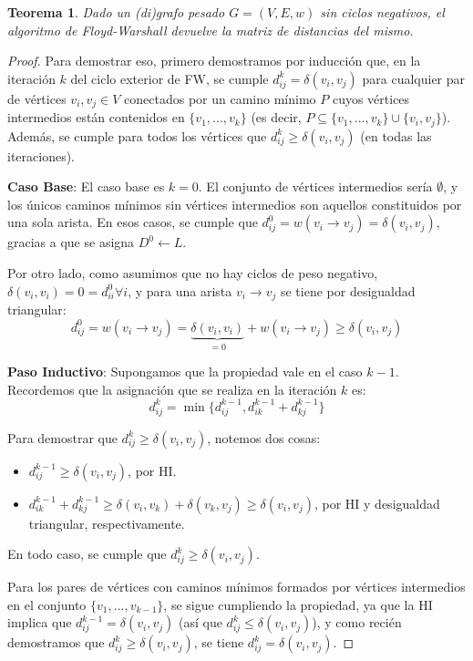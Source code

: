 \documentclass[a4paper]{report}
\newtheorem*{theorem*}{Teorema}
\begin{document}
\begin{theorem*}
    Dado un (di)grafo pesado $G = (V, E, w)$ sin ciclos negativos, el algoritmo de Floyd-Warshall devuelve la matriz de distancias del mismo.
\end{theorem*}
\begin{proof}
    Para demostrar eso, primero demostramos por inducción que, en la iteración $k$ del ciclo exterior de FW, se cumple $d^k_{ij} = \delta(v_i, v_j)$ para cualquier par de vértices $v_i, v_j \in V$ conectados por un camino mínimo $P$ cuyos vértices intermedios están contenidos en $\{v_1, ..., v_k\}$ (es decir, $P \subseteq \{v_1, ..., v_k\} \cup \{v_i, v_j\}$). Además, se cumple para todos los vértices que $d^k_{ij} \geq \delta(v_i, v_j)$ (en todas las iteraciones).

    \textbf{Caso Base}: El caso base es $k = 0$. El conjunto de vértices intermedios sería $\emptyset$, y los únicos caminos mínimos sin vértices intermedios son aquellos constituidos por una sola arista. En esos casos, se cumple que $d^0_{ij} = w(v_i \rightarrow v_j) = \delta(v_i, v_j)$, gracias a que se asigna $D^0 \gets L$.

    Por otro lado, como asumimos que no hay ciclos de peso negativo, $\delta(v_i, v_i) = 0 = d^0_{ii} \forall i$, y para una arista $v_i \rightarrow v_j$ se tiene por desigualdad triangular:
    $$d^0_{ij} = w(v_i \rightarrow v_j) = \underbrace{{\delta(v_i, v_i)}}_{= 0} + w(v_i \rightarrow v_j) \geq \delta(v_i, v_j)$$

    \textbf{Paso Inductivo}: Supongamos que la propiedad vale en el caso $k - 1$. Recordemos que la asignación que se realiza en la iteración $k$ es:
    $$d^k_{ij} = \min{\{d^{k - 1}_{ij}, d^{k - 1}_{ik} + d^{k - 1}_{kj}\}}$$

    Para demostrar que $d^k_{ij} \geq \delta(v_i, v_j)$, notemos dos cosas:
    \begin{itemize}
        \item $d^{k - 1}_{ij} \geq \delta(v_i, v_j)$, por HI.
        \item $d^{k - 1}_{ik} + d^{k - 1}_{kj} \geq \delta(v_i, v_k) + \delta(v_k, v_j) \geq \delta(v_i, v_j)$, por HI y desigualdad triangular, respectivamente.
    \end{itemize}

    En todo caso, se cumple que $d^k_{ij} \geq \delta(v_i, v_j)$.

    Para los pares de vértices con caminos mínimos formados por vértices intermedios en el conjunto $\{v_1, ..., v_{k - 1}\}$, se sigue cumpliendo la propiedad, ya que la HI implica que $d^{k - 1}_{ij} = \delta(v_i, v_j)$ (así que $d^k_{ij} \leq \delta(v_i, v_j)$), y como recién demostramos que $d^k_{ij} \geq \delta(v_i, v_j)$, se tiene $d^k_{ij} = \delta(v_i, v_j)$.


\end{proof}
\end{document}
